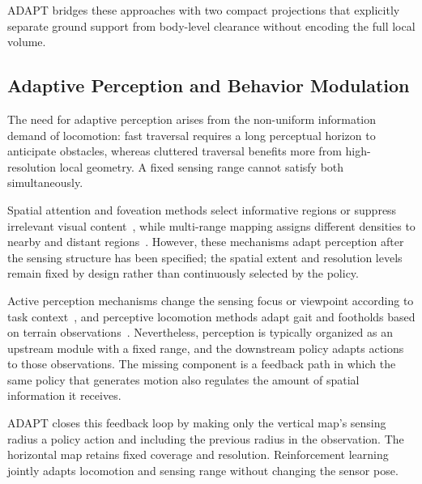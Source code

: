 ADAPT bridges these approaches with two compact projections that explicitly separate ground support from body-level clearance without encoding the full local volume.

\subsection{Adaptive Perception and Behavior Modulation}
The need for adaptive perception arises from the non-uniform information demand of locomotion: fast traversal requires a long perceptual horizon to anticipate obstacles, whereas cluttered traversal benefits more from high-resolution local geometry. A fixed sensing range cannot satisfy both simultaneously.


Spatial attention and foveation methods select informative regions or suppress irrelevant visual content~\cite{Wang_2025_AdaptiveVision,Zhang_2026_FocusNav}, while multi-range mapping assigns different densities to nearby and distant regions~\cite{Patel_2024_RoadRunnerMM}. However, these mechanisms adapt perception after the sensing structure has been specified; the spatial extent and resolution levels remain fixed by design rather than continuously selected by the policy.

Active perception mechanisms change the sensing focus or viewpoint according to task context~\cite{Liu_2026_ActiveVLA}, and perceptive locomotion methods adapt gait and footholds based on terrain observations~\cite{zhuang2024humanoid,long2025learning,wang2025beamdojo,ren2025vb}. Nevertheless, perception is typically organized as an upstream module with a fixed range, and the downstream policy adapts actions to those observations. The missing component is a feedback path in which the same policy that generates motion also regulates the amount of spatial information it receives.

ADAPT closes this feedback loop by making only the vertical map's sensing radius a policy action and including the previous radius in the observation. The horizontal map retains fixed coverage and resolution. Reinforcement learning jointly adapts locomotion and sensing range without changing the sensor pose.

